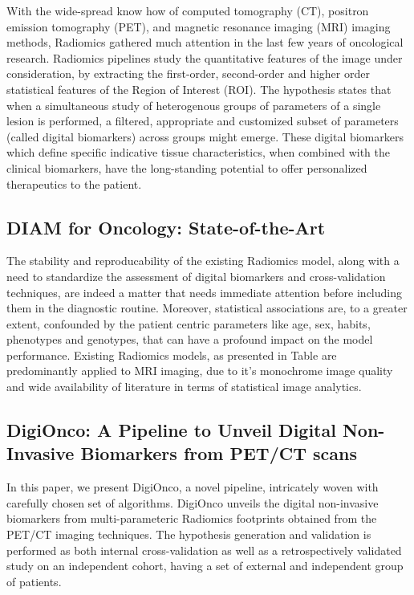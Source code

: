 \documentclass[10pt,journal,compsoc]{IEEEtran}
\begin{document}
With the wide-spread know how of computed tomography (CT), positron emission tomography (PET), and magnetic resonance imaging (MRI) imaging methods, Radiomics gathered much attention in the last few years of oncological research. Radiomics pipelines study the quantitative features of the image under consideration, by extracting the first-order, second-order and higher order statistical features of the Region of Interest (ROI). The hypothesis states that when a simultaneous study of heterogenous groups of parameters of a single lesion is performed, a filtered, appropriate and customized subset of parameters (called digital biomarkers) across groups might emerge. These digital biomarkers which define specific indicative tissue characteristics, when combined with the clinical biomarkers, have the long-standing potential to offer personalized therapeutics to the patient.

\subsection{DIAM for Oncology: State-of-the-Art}
The stability and reproducability of the existing Radiomics model, along with a need to standardize the assessment of digital biomarkers and cross-validation techniques, are indeed a matter that needs immediate attention before including them in the diagnostic routine. Moreover, statistical associations are, to a greater extent, confounded by the patient centric parameters like age, sex, habits, phenotypes and genotypes, that can have a profound impact on the model performance. Existing Radiomics models, as presented in Table are predominantly applied to MRI imaging, due to it's monochrome image quality and wide availability of literature in terms of statistical image analytics.

\subsection{DigiOnco: A Pipeline to Unveil Digital Non-Invasive Biomarkers from PET/CT scans}

In this paper, we present DigiOnco, a novel pipeline, intricately woven with carefully chosen set of algorithms. DigiOnco unveils the digital non-invasive biomarkers from multi-parameteric Radiomics footprints obtained from the PET/CT imaging techniques. The hypothesis generation and validation is performed as both internal cross-validation as well as a retrospectively validated study on an independent cohort, having a set of external and independent group of patients.
\end{document}

